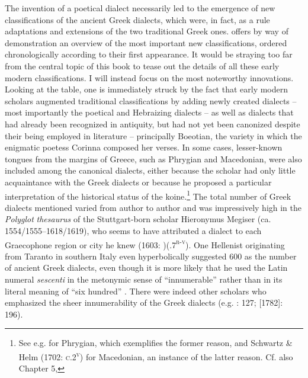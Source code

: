 The invention of a poetical dialect necessarily led to the emergence of new classifications of the ancient Greek dialects, which were, in fact, as a rule adaptations and extensions of the two traditional Greek ones.  offers by way of demonstration an overview of the most important new classifications, ordered chronologically according to their first appearance. It would be straying too far from the central topic of this book to tease out the details of all these early modern classifications. I will instead focus on the most noteworthy innovations. Looking at the table, one is immediately struck by the fact that early modern scholars augmented traditional classifications by adding newly created dialects – most importantly the poetical and Hebraizing dialects – as well as dialects that had already been recognized in antiquity, but had not yet been canonized despite their being employed in literature – principally Boeotian, the variety in which the enigmatic poetess Corinna composed her verses. In some cases, lesser-known tongues from the margins of Greece, such as Phrygian and Macedonian, were also included among the canonical dialects, either because the scholar had only little acquaintance with the Greek dialects or because he proposed a particular interpretation of the historical status of the koine.\footnote{See e.g. \citet[131]{Kircher1679} for Phrygian, which exemplifies the former reason, and Schwartz \& Helm (1702: \textsc{c.2}\textsc{\textsuperscript{v}}) for Macedonian, an instance of the latter reason. Cf. also Chapter 5, } The total number of Greek dialects mentioned varied from author to author and was impressively high in the \textit{Polyglot} \textit{thesaurus} of the Stuttgart-born scholar Hieronymus Megiser (ca. 1554/1555–1618/1619), who seems to have attributed a dialect to each Graecophone region or city he knew (1603: )(.7\textsc{\textsuperscript{r-v}}). One Hellenist originating from Taranto in southern Italy even hyperbolically suggested 600 as the number of ancient Greek dialects, even though it is more likely that he used the Latin numeral \textit{sescenti} in the metonymic sense of “innumerable” rather than in its literal meaning of “six hundred” \citep[9]{Giovane1589}. There were indeed other scholars who emphasized the sheer innumerability of the Greek dialects (e.g. \citealt{Bischoff1708}: 127; \citealt{Ries1786} [1782]: 196).

